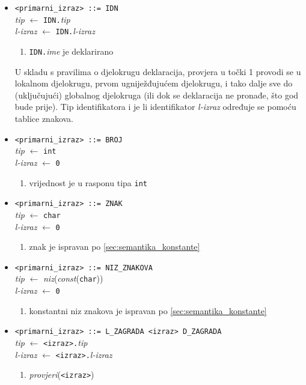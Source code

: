 \documentclass[times, 12pt, utf8]{book}
\begin{document}
\begin{itemize}

\item
\verb|<primarni_izraz> ::= IDN|\\
\emph{tip} \(\leftarrow\) \verb|IDN.|\emph{tip}\\
\emph{l-izraz} \(\leftarrow\) \verb|IDN.|\emph{l-izraz}
\begin{enumerate}
\item
\verb|IDN.|\emph{ime} je deklarirano
\end{enumerate}

U skladu s pravilima o djelokrugu deklaracija, provjera u točki 1 provodi se u lokalnom djelokrugu, prvom ugniježđujućem djelokrugu, i tako dalje sve do (uključujući) globalnog djelokruga (ili dok se deklaracija ne pronađe, što god bude prije).
Tip identifikatora i je li identifikator \emph{l-izraz} određuje se pomoću tablice znakova.

\item
\verb|<primarni_izraz> ::= BROJ|\\
\emph{tip} \(\leftarrow\) \verb|int|\\
\emph{l-izraz} \(\leftarrow\) \verb|0|
\begin{enumerate}
\item
vrijednost je u rasponu tipa \verb|int|
\end{enumerate}

\item
\verb|<primarni_izraz> ::= ZNAK|\\
\emph{tip} \(\leftarrow\) \verb|char|\\
\emph{l-izraz} \(\leftarrow\) \verb|0|
\begin{enumerate}
\item
znak je ispravan po \ref{sec:semantika_konstante}
\end{enumerate}

\item
\verb|<primarni_izraz> ::= NIZ_ZNAKOVA|\\
\emph{tip} \(\leftarrow\) \emph{niz}(\emph{const}(\verb|char|))\\
\emph{l-izraz} \(\leftarrow\) \verb|0|
\begin{enumerate}
\item
konstantni niz znakova je ispravan po \ref{sec:semantika_konstante}
\end{enumerate}

\item
\verb|<primarni_izraz> ::= L_ZAGRADA <izraz> D_ZAGRADA|\\
\emph{tip} \(\leftarrow\) \verb|<izraz>.|\emph{tip}\\
\emph{l-izraz} \(\leftarrow\) \verb|<izraz>.|\emph{l-izraz}
\begin{enumerate}
\item
\emph{provjeri}(\verb|<izraz>|)
\end{enumerate}

\end{itemize}
\end{document}
